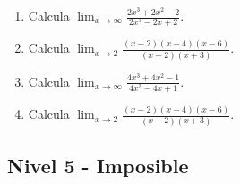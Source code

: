 \documentclass[11pt,a4paper]{article}
\begin{document}
\begin{enumerate}[label=\textbf{E\arabic*.},start=261]
\item Calcula $\displaystyle\lim_{x\to\infty}\frac{2x^3+2x^2-2}{2x^3-2x+2}$. 

\item Calcula $\displaystyle\lim_{x\to 2}\frac{(x-2)(x-4)(x-6)}{(x-2)(x+3)}$. 

\item Calcula $\displaystyle\lim_{x\to\infty}\frac{4x^3+4x^2-1}{4x^3-4x+1}$. 

\item Calcula $\displaystyle\lim_{x\to 2}\frac{(x-2)(x-4)(x-6)}{(x-2)(x+3)}$. 

\end{enumerate}

\newpage

\subsection{Nivel 5 - Imposible}
\end{document}
